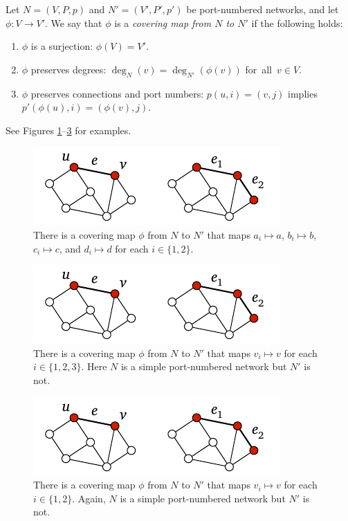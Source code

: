 Let $N = (V,P,p)$ and $N' = (V'\!,P'\!,p')$ be port-numbered networks, and let $\phi \colon V \to V'$. We say that $\phi$ is a \emph{covering map from $N$ to $N'$} if the following holds:
\begin{enumerate}\raggedright
    \item $\phi$ is a surjection: $\phi(V) = V'$.
    \item $\phi$ preserves degrees: $\deg_{N}(v) = \deg_{N'}(\phi(v))$ for~all~$v \in V$.
    \item $\phi$ preserves connections and port numbers: $p(u,i) = (v,j)$ implies $p'(\phi(u),i) = (\phi(v),j)$.
\end{enumerate}
See Figures \ref{fig:covering-map}--\ref{fig:covering-map3} for examples.

\begin{figure}
    \centering
    \includegraphics[page=\PCoveringMap]{figs.pdf}
    \caption{There is a covering map $\phi$ from $N$ to $N'$ that maps $a_i \mapsto a$, $b_i \mapsto b$, $c_i \mapsto c$, and $d_i \mapsto d$ for each $i \in \{1, 2\}$.}\label{fig:covering-map}
\end{figure}

\begin{figure}
    \centering
    \includegraphics[page=\PCoveringMapB]{figs.pdf}
    \caption{There is a covering map $\phi$ from $N$ to $N'$ that maps $v_i \mapsto v$ for each $i \in \{1, 2, 3\}$. Here $N$ is a simple port-numbered network but $N'$ is not.}\label{fig:covering-map2}
\end{figure}

\begin{figure}
    \centering
    \includegraphics[page=\PCoveringMapC]{figs.pdf}
    \caption{There is a covering map $\phi$ from $N$ to $N'$ that maps $v_i \mapsto v$ for each $i \in \{1, 2\}$. Again, $N$ is a simple port-numbered network but $N'$ is not.}\label{fig:covering-map3}
\end{figure}

